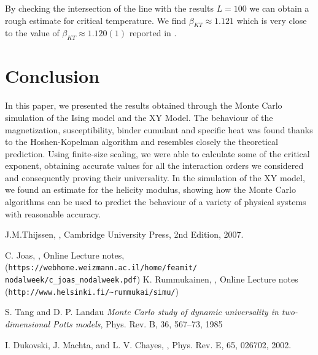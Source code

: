 \documentclass[twoside]{article}
\begin{document}
\begin{multicols}{2}
By checking the intersection of the line with the results $L=100$ we can obtain a rough estimate for critical temperature. We find $\beta_{KT} \approx 1.121$ which is very close to the value of $\beta_{KT} \approx 1.120(1)$ reported in \cite{dukovski}.

\section{Conclusion}
In this paper, we presented the results obtained through the Monte Carlo simulation of the Ising model and the XY Model.
The behaviour of the magnetization, susceptibility, binder cumulant and specific heat was found thanks to the Hoshen-Kopelman algorithm and resembles closely the theoretical prediction. Using finite-size scaling, we were able to calculate some of the critical exponent, obtaining accurate values for all the interaction orders we considered and consequently proving their universality.
In the simulation of the XY model, we found an estimate for the helicity modulus, showing how the Monte Carlo algorithms can be used to predict the behaviour of a variety of physical systems with reasonable accuracy.

\begin{thebibliography}{99} %

J.M.Thijssen,
, Cambridge University Press, 2nd Edition, 2007.

C. Joas, 
, Online Lecture notes, (\verb+https://webhome.weizmann.ac.il/home/feamit/+ \\ \verb+nodalweek/c_joas_nodalweek.pdf+)
K. Rummukainen,
, Online Lecture notes (\verb+http://www.helsinki.fi/~rummukai/simu/+)

S. Tang and D. P. Landau
{\em Monte Carlo study of dynamic universality in two-dimensional Potts models}, Phys. Rev. B, 36, 567–73, 1985

I. Dukovski, J. Machta, and L. V. Chayes, 
, Phys. Rev. E, 65, 026702, 2002.
\end{thebibliography}

\end{multicols}
\end{document}
